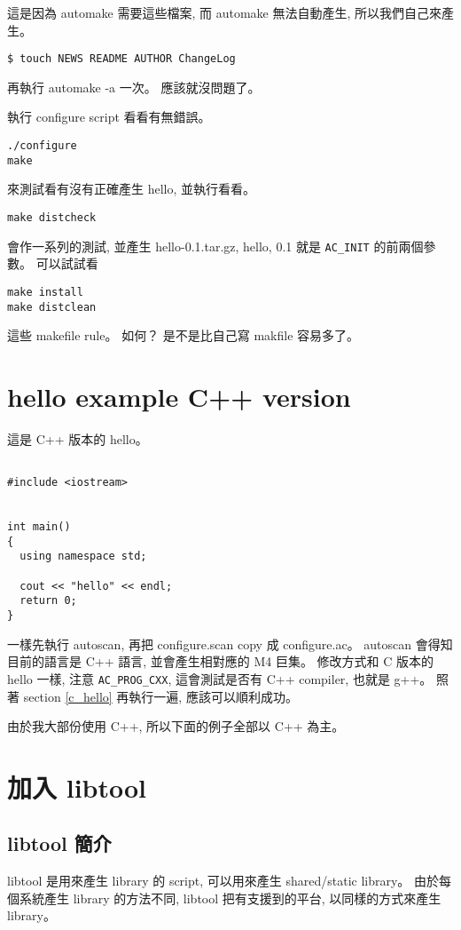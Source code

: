 \documentclass[12pt,a4]{article}
\begin{document}
\begin{CJK}{UTF8}{cwmu}
這是因為 automake 需要這些檔案, 而 automake 無法自動產生,
所以我們自己來產生。
\begin{verbatim}
$ touch NEWS README AUTHOR ChangeLog
\end{verbatim}

再執行 automake -a 一次。
應該就沒問題了。

執行 configure script 看看有無錯誤。

\begin{verbatim}
./configure
make
\end{verbatim}
來測試看有沒有正確產生 hello, 並執行看看。

\begin{verbatim}
make distcheck
\end{verbatim}

會作一系列的測試, 並產生 hello-0.1.tar.gz,
hello, 0.1 就是 \verb+AC_INIT+ 的前兩個參數。
可以試試看

\begin{verbatim}
make install
make distclean
\end{verbatim}

這些 makefile rule。 如何？
是不是比自己寫 makfile 容易多了。


\section{hello example C++ version}

這是 C++ 版本的 hello。
\begin{verbatim}

#include <iostream>


int main()
{
  using namespace std;

  cout << "hello" << endl;
  return 0;
}
\end{verbatim}

一樣先執行 autoscan, 再把 configure.scan copy 成 configure.ac。
autoscan 會得知目前的語言是 C++ 語言, 並會產生相對應的 M4 巨集。
修改方式和 C 版本的 hello 一樣, 注意 \verb+AC_PROG_CXX+,
這會測試是否有 C++ compiler, 也就是 g++。
照著 section \ref{c_hello} 再執行一遍, 應該可以順利成功。

由於我大部份使用 C++, 所以下面的例子全部以 C++ 為主。


\section{加入 libtool}

\subsection{libtool 簡介}
libtool 是用來產生 library 的 script,
可以用來產生 shared/static library。
由於每個系統產生 library 的方法不同, libtool 把有支援到的平台,
以同樣的方式來產生 library。


\end{CJK}
\end{document}
